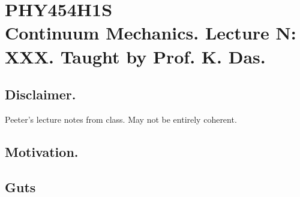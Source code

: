 
%

\chapter{PHY454H1S\\Continuum Mechanics.  Lecture N: XXX.  Taught by Prof. K. Das.}
\label{chap:continuumLN}
{}
\date{Jan XX, 2012}

\beginArtWithToc

\section{Disclaimer.}

Peeter's lecture notes from class.  May not be entirely coherent.

\section{Motivation.}

\section{Guts}

\EndArticle
